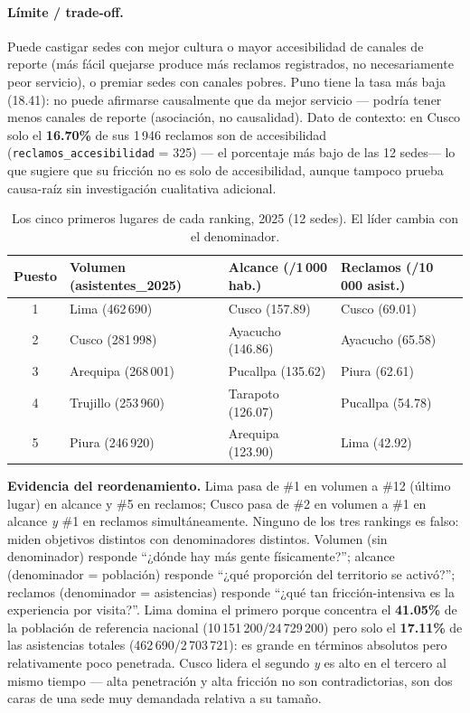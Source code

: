 \paragraph{Límite / trade-off.} Puede castigar sedes con mejor cultura o mayor accesibilidad de canales de reporte (más fácil quejarse produce más reclamos registrados, no necesariamente peor servicio), o premiar sedes con canales pobres. Puno tiene la tasa más baja (18.41): no puede afirmarse causalmente que da mejor servicio --- podría tener menos canales de reporte (asociación, no causalidad). Dato de contexto: en Cusco solo el \textbf{16.70\%} de sus 1\,946 reclamos son de accesibilidad (\texttt{reclamos\_accesibilidad} = 325) --- el porcentaje más bajo de las 12 sedes--- lo que sugiere que su fricción no es solo de accesibilidad, aunque tampoco prueba causa-raíz sin investigación cualitativa adicional.

\begin{table}[H]
\centering
\small
\caption{Los cinco primeros lugares de cada ranking, 2025 (12 sedes). El líder cambia con el denominador.}
\label{tab:c4-rankings}
\begin{tabular}{c l l l}
\toprule
Puesto & Volumen (asistentes\_2025) & Alcance (/1\,000 hab.) & Reclamos (/10\,000 asist.) \\
\midrule
1 & Lima (462\,690) & Cusco (157.89) & Cusco (69.01) \\
2 & Cusco (281\,998) & Ayacucho (146.86) & Ayacucho (65.58) \\
3 & Arequipa (268\,001) & Pucallpa (135.62) & Piura (62.61) \\
4 & Trujillo (253\,960) & Tarapoto (126.07) & Pucallpa (54.78) \\
5 & Piura (246\,920) & Arequipa (123.90) & Lima (42.92) \\
\bottomrule
\end{tabular}
\end{table}

\textbf{Evidencia del reordenamiento.} Lima pasa de \#1 en volumen a \#12 (último lugar) en alcance y \#5 en reclamos; Cusco pasa de \#2 en volumen a \#1 en alcance \emph{y} \#1 en reclamos simultáneamente. Ninguno de los tres rankings es falso: miden objetivos distintos con denominadores distintos. Volumen (sin denominador) responde ``¿dónde hay más gente físicamente?''; alcance (denominador = población) responde ``¿qué proporción del territorio se activó?''; reclamos (denominador = asistencias) responde ``¿qué tan fricción-intensiva es la experiencia por visita?''. Lima domina el primero porque concentra el \textbf{41.05\%} de la población de referencia nacional (10\,151\,200/24\,729\,200) pero solo el \textbf{17.11\%} de las asistencias totales (462\,690/2\,703\,721): es grande en términos absolutos pero relativamente poco penetrada. Cusco lidera el segundo \emph{y} es alto en el tercero al mismo tiempo --- alta penetración y alta fricción no son contradictorias, son dos caras de una sede muy demandada relativa a su tamaño.

